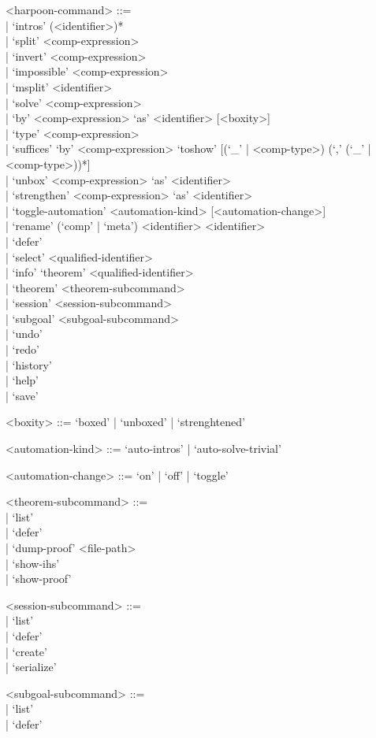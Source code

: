 \documentclass[11pt]{article}
\begin{document}
\begin{grammar}
<harpoon-command> ::= \hfill\\
| `intros' (<identifier>)*\\
| `split' <comp-expression>\\
| `invert' <comp-expression>\\
| `impossible' <comp-expression>\\
| `msplit' <identifier>\\
| `solve' <comp-expression>\\
| `by' <comp-expression> `as' <identifier> [<boxity>]\\
| `type' <comp-expression>\\
| `suffices' `by' <comp-expression> `toshow' [(`_' | <comp-type>) (`,' (`_' | <comp-type>))*]\\
| `unbox' <comp-expression> `as' <identifier>\\
| `strengthen' <comp-expression> `as' <identifier>\\
| `toggle-automation' <automation-kind> [<automation-change>]\\
| `rename' (`comp' | `meta') <identifier> <identifier>\\
| `defer'\\
| `select' <qualified-identifier>\\
| `info' `theorem' <qualified-identifier>\\
| `theorem' <theorem-subcommand>\\
| `session' <session-subcommand>\\
| `subgoal' <subgoal-subcommand>\\
| `undo'\\
| `redo'\\
| `history'\\
| `help'\\
| `save'

<boxity> ::=
  `boxed'
| `unboxed'
| `strenghtened'

<automation-kind> ::= `auto-intros' | `auto-solve-trivial'

<automation-change> ::= `on' | `off' | `toggle'

<theorem-subcommand> ::= \hfill\\
| `list'\\
| `defer'\\
| `dump-proof' <file-path>\\
| `show-ihs'\\
| `show-proof'

<session-subcommand> ::= \hfill\\
| `list'\\
| `defer'\\
| `create'\\
| `serialize'

<subgoal-subcommand> ::= \hfill\\
| `list'\\
| `defer'
\end{grammar}
\end{document}

